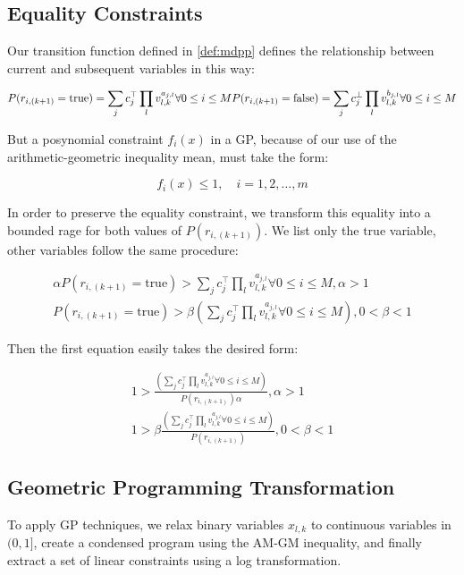 \documentclass[11pt]{article}
\begin{document}
\subsection{Equality Constraints}

Our transition function defined in \autoref{def:mdpp} defines the
relationship between current and subsequent variables in this way:

\begin{equation}
  P(r_{i,(k+1)} = \text{true}) = \sum_{j} c^{\top}_j \prod_{l} v_{l,k}^{a_{j,l}} \forall 0 \leq i \leq M \\ 
  P(r_{i,(k+1)} = \text{false}) = \sum_{j} c^{\bot}_j \prod_{l} v_{l,k}^{b_{j,l}} \forall 0 \leq i \leq M \\
\end{equation}

But a posynomial constraint $f_i(x)$ in a GP, because of our use of the
arithmetic-geometric inequality mean, must take the form:

\begin{equation}
f_i(x) \leq 1, \quad i = 1, 2, \ldots, m
\end{equation}

In order to preserve the equality constraint, we transform this
equality into a bounded rage for both values of $P(r_{i,(k+1)})$. We
list only the $\text{true}$ variable, other variables follow the same procedure:

\begin{align*}
  \alpha P(r_{i,(k+1)} = \text{true}) > \sum_{j} c^{\top}_j \prod_{l} v_{l,k}^{a_{j,l}} \forall 0 \leq i \leq M, \alpha > 1 \\
  P(r_{i,(k+1)} = \text{true}) > \beta (\sum_{j} c^{\top}_j \prod_{l} v_{l,k}^{a_{j,l}} \forall 0 \leq i \leq M), 0 < \beta < 1
\end{align*}

Then the first equation easily takes the desired form:

\begin{align}
  1 > \frac{(\sum_{j} c^{\top}_j \prod_{l} v_{l,k}^{a_{j,l}} \forall 0 \leq i \leq M)}{P(r_{i,(k+1)}) \alpha}, \alpha > 1 \\
  1 > \beta \frac{(\sum_{j} c^{\top}_j \prod_{l} v_{l,k}^{a_{j,l}} \forall 0 \leq i \leq M)}{P(r_{i,(k+1)})}, 0 < \beta < 1  
\end{align}


\subsection{Geometric Programming Transformation}
To apply GP techniques, we relax binary variables $x_{l,k}$ to
continuous variables in $(0,1]$, create a condensed program using the
AM-GM inequality, and finally extract a set of linear constraints
using a log transformation.
\end{document}
